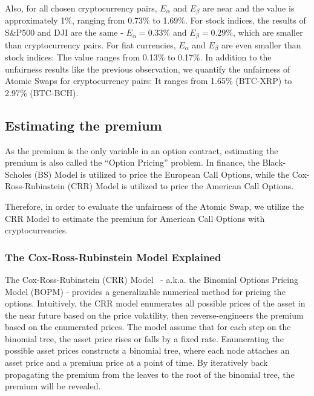Also, for all chosen cryptocurrency pairs, $E_{\alpha}$ and $E_{\beta}$ are near and the value is approximately 1\%, ranging from 0.73\% to 1.69\%.
For stock indices, the results of S\&P500 and DJI are the same - $E_\alpha = 0.33\%$ and $E_\beta = 0.29\%$, which are smaller than cryptocurrency pairs.
For fiat currencies, $E_\alpha$ and $E_\beta$ are even smaller than stock indices: The value ranges from 0.13\% to 0.17\%.
In addition to the unfairness results like the previous observation, we quantify the unfairness of Atomic Swaps for cryptocurrency pairs: It ranges from  1.65\% (BTC-XRP) to 2.97\% (BTC-BCH).



















\subsection{Estimating the premium}


As the premium is the only variable in an option contract, estimating the premium is also called the ``Option Pricing'' problem.
In finance, the Black-Scholes (BS) Model is utilized to price the European Call Options,
while the Cox-Ross-Rubinstein (CRR) Model is utilized to price the American Call Options.

Therefore, in order to evaluate the unfairness of the Atomic Swap, we utilize the CRR Model to estimate the premium for American Call Options with cryptocurrencies.

\subsubsection{The Cox-Ross-Rubinstein Model Explained}

The Cox-Ross-Rubinstein (CRR) Model~\cite{cox1979option} - a.k.a. the Binomial Options Pricing Model (BOPM) - provides a generalizable numerical method for pricing the options.
Intuitively, the CRR model enumerates all possible prices of the asset in the near future based on the price volatility,
then reverse-engineers the premium based on the enumerated prices.
The model assume that for each step on the binomial tree, the asset price rises or falls by a fixed rate.
Enumerating the possible asset prices constructs a binomial tree, where each node attaches an asset price and a premium price at a point of time.
By iteratively back propagating the premium from the leaves to the root of the binomial tree, the premium will be revealed.

